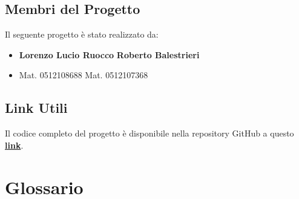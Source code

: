 \documentclass[a4paper,12pt]{article}
\begin{document}
	\subsection{Membri del Progetto}
	Il seguente progetto è stato realizzato da:  
\begin{itemize}
\item[] \textbf{Lorenzo Lucio Ruocco}\hspace{2cm}
            \textbf{Roberto Balestrieri}
	\vspace{-0.5cm}
\item[] Mat. 0512108688 \hspace{3.4cm}
	  Mat. 0512107368
\end{itemize}
	\subsection{Link Utili}
Il codice completo del progetto è disponibile nella repository GitHub a questo \textcolor{blue}{\href{https://github.com/LRuocco22/NozApp/}{\textbf{{link}}}}.
\section{Glossario}
\end{document}

